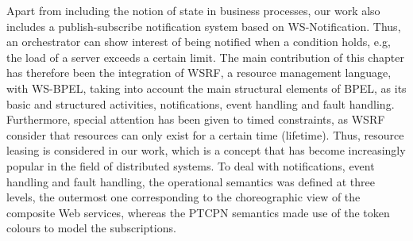Apart from including the notion of state in business processes, our work also includes a publish-subscribe notification system based on WS-Notification. 
Thus, an orchestrator can show interest of being notified when a condition holds, e.g, the load of a server exceeds a certain limit. The main contribution of this chapter has therefore been the integration of WSRF, a resource management language, with WS-BPEL, taking into
account the main structural elements of BPEL, as its basic and structured activities, notifications, event handling and fault handling. Furthermore, special attention has been given to timed constraints, as WSRF consider that resources can only exist for a certain time (lifetime). Thus, resource leasing is considered in our work, which is a concept that has become increasingly popular in the field of distributed systems. To deal with notifications, event handling and fault handling, the operational semantics was defined at three levels, the outermost one corresponding to the choreographic view of the composite Web services, whereas the PTCPN semantics made use of the token colours to model the subscriptions.


